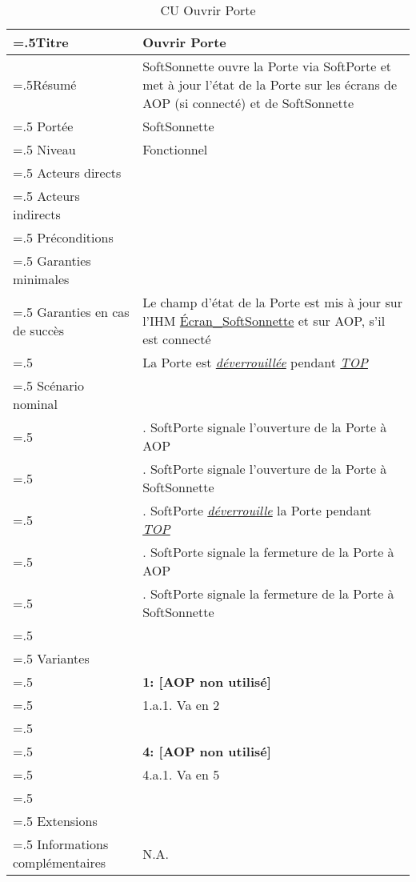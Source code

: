 \begin{table}[H]
  \centering
  \begin{tabularx}{\textwidth}{|>{\hsize=.5\hsize}X|>{\hsize=1.5\hsize}X|}
    \hline
    Titre & Ouvrir Porte \\
    \hline
    Résumé & SoftSonnette ouvre la Porte via SoftPorte et met à jour l'état de la Porte sur les écrans de AOP (si connecté) et de SoftSonnette \\
    \hline
    Portée & SoftSonnette \\
    \hline
    Niveau & Fonctionnel \\
    \hline
    Acteurs directs & \\
    \hline
    Acteurs indirects & \\
    \hline
    Préconditions & \\
    \hline
    Garanties minimales & \\
    \hline
    Garanties en cas de succès &  
    Le champ d'état de la Porte est mis à jour sur l'IHM \hyperlink{EcranWebcamConnec}{Écran\_SoftSonnette} et sur AOP, s'il est connecté \\
    & La Porte est \hyperlink{deverrouiller}{\textit{déverrouillée}} pendant \hyperlink{top}{\textit{TOP}} \\
    \hline
    Scénario nominal &    \\
    &    1. SoftPorte signale l'ouverture de la Porte à AOP \\
    &    2. SoftPorte signale l'ouverture de la Porte à SoftSonnette \\
    &    3. SoftPorte \hyperlink{deverrouiller}{\textit{déverrouille}} la Porte pendant \hyperlink{top}{\textit{TOP}} \\
    &    4. SoftPorte signale la fermeture de la Porte à AOP \\
    &    5. SoftPorte signale la fermeture de la Porte à SoftSonnette \\
    & \\
    \hline
    Variantes & \\
    & \textbf{1: [AOP non utilisé]} \\
    & 1.a.1. Va en 2 \\
    & \\
    & \textbf{4: [AOP non utilisé]} \\
    & 4.a.1. Va en 5 \\
    & \\
    \hline
    Extensions & \\
    \hline
    Informations complémentaires & N.A. \\
    \hline
  \end{tabularx}
  \caption{CU Ouvrir Porte}
  \label{tableau-cu-ouvrir-porte}
\end{table}
\newpage

